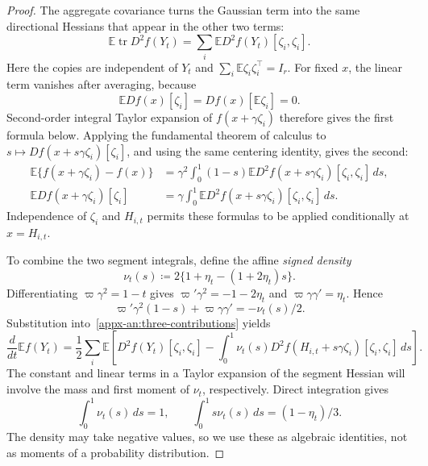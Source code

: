 \documentclass[11pt,letterpaper]{article}
\theoremstyle{remark}
\newcommand{\E}{\mathbb E}
\newcommand{\tr}{\operatorname{tr}}
\newcommand{\dd}{\,d}
\begin{document}
\begin{proof}
The aggregate covariance turns the Gaussian term into the same
directional Hessians that appear in the other two terms:
\[
 \E\tr D^2f(Y_t)
 =\sum_i\E D^2f(Y_t)[\zeta_i,\zeta_i].
\]
Here the copies are independent of \(Y_t\) and
\(\sum_i\E\zeta_i\zeta_i^\top=I_r\).
For fixed $x$, the linear term vanishes after averaging, because
\[
 \E Df(x)[\zeta_i]=Df(x)[\E\zeta_i]=0.
\]
Second-order integral Taylor expansion of $f(x+\gamma\zeta_i)$
therefore gives the first formula below. Applying the fundamental
theorem of calculus to
$s\mapsto Df(x+s\gamma\zeta_i)[\zeta_i]$, and using the same
centering identity, gives the second:
\begin{align*}
 \E\{f(x+\gamma\zeta_i)-f(x)\}
 &=\gamma^2\int_0^1(1-s)
        \E D^2f(x+s\gamma\zeta_i)[\zeta_i,\zeta_i]\dd s,\\
 \E Df(x+\gamma\zeta_i)[\zeta_i]
 &=\gamma\int_0^1
        \E D^2f(x+s\gamma\zeta_i)[\zeta_i,\zeta_i]\dd s.
\end{align*}
Independence of \(\zeta_i\) and \(H_{i,t}\) permits these formulas
to be applied conditionally at \(x=H_{i,t}\).

To combine the two segment integrals, define the affine
\emph{signed density}
\[
 \nu_t(s)\coloneqq2\{1+\eta_t-(1+2\eta_t)s\}.
\]
Differentiating \(\varpi\gamma^2=1-t\) gives
\(\varpi'\gamma^2=-1-2\eta_t\) and
\(\varpi\gamma\gamma'=\eta_t\). Hence
\[
 \varpi'\gamma^2(1-s)+\varpi\gamma\gamma'
 =-\nu_t(s)/2.
\]
Substitution into~\eqref{appx-an:three-contributions} yields
\begin{equation}
 \frac{d}{dt}\E f(Y_t)
 =\frac12\sum_i\E\left[
    D^2f(Y_t)[\zeta_i,\zeta_i]
    -\int_0^1\nu_t(s)D^2f(H_{i,t}+s\gamma\zeta_i)
                       [\zeta_i,\zeta_i]\dd s\right].
 \label{appx-an:signed-hessian}
\end{equation}
The constant and linear terms in a Taylor expansion of the
segment Hessian will involve the mass and first moment of
$\nu_t$, respectively. Direct integration gives
\begin{equation}
 \int_0^1\nu_t(s)\dd s=1,\qquad
 \int_0^1s\nu_t(s)\dd s=(1-\eta_t)/3.
 \label{appx-an:signed-moments}
\end{equation}
The density may take negative values, so we use these as algebraic identities,
not as moments of a probability distribution.


\end{proof}
\end{document}
